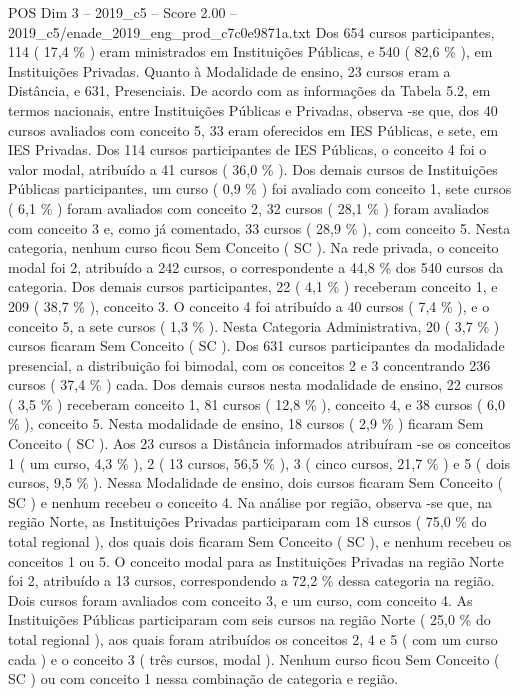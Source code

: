 \begin{textsample}{POS Dim 3 – 2019\_c5 – Score 2.00 – 2019\_c5/enade\_2019\_eng\_prod\_c7c0e9871a.txt}
Dos 654 cursos participantes, 114 ( 17,4 \% ) eram ministrados em Instituições Públicas, e 540 ( 82,6 \% ), em Instituições Privadas.
Quanto à Modalidade de ensino, 23 cursos eram a Distância, e 631, Presenciais.
De acordo com as informações da Tabela 5.2, em termos nacionais, entre Instituições Públicas e Privadas, observa -se que, dos 40 cursos avaliados com conceito 5, 33 eram oferecidos em IES Públicas, e sete, em IES Privadas.
Dos 114 cursos participantes de IES Públicas, o conceito 4 foi o valor modal, atribuído a 41 cursos ( 36,0 \% ).
Dos demais cursos de Instituições Públicas participantes, um curso ( 0,9 \% ) foi avaliado com conceito 1, sete cursos ( 6,1 \% ) foram avaliados com conceito 2, 32 cursos ( 28,1 \% ) foram avaliados com conceito 3 e, como já comentado, 33 cursos ( 28,9 \% ), com conceito 5.
Nesta categoria, nenhum curso ficou Sem Conceito ( SC ).
Na rede privada, o conceito modal foi 2, atribuído a 242 cursos, o correspondente a 44,8 \% dos 540 cursos da categoria.
Dos demais cursos participantes, 22 ( 4,1 \% ) receberam conceito 1, e 209 ( 38,7 \% ), conceito 3.
O conceito 4 foi atribuído a 40 cursos ( 7,4 \% ), e o conceito 5, a sete cursos ( 1,3 \% ).
Nesta Categoria Administrativa, 20 ( 3,7 \% ) cursos ficaram Sem Conceito ( SC ).
Dos 631 cursos participantes da modalidade presencial, a distribuição foi bimodal, com os conceitos 2 e 3 concentrando 236 cursos ( 37,4 \% ) cada.
Dos demais cursos nesta modalidade de ensino, 22 cursos ( 3,5 \% ) receberam conceito 1, 81 cursos ( 12,8 \% ), conceito 4, e 38 cursos ( 6,0 \% ), conceito 5.
Nesta modalidade de ensino, 18 cursos ( 2,9 \% ) ficaram Sem Conceito ( SC ).
Aos 23 cursos a Distância informados atribuíram -se os conceitos 1 ( um curso, 4,3 \% ), 2 ( 13 cursos, 56,5 \% ), 3 ( cinco cursos, 21,7 \% ) e 5 ( dois cursos, 9,5 \% ).
Nessa Modalidade de ensino, dois cursos ficaram Sem Conceito ( SC ) e nenhum recebeu o conceito 4.
Na análise por região, observa -se que, na região Norte, as Instituições Privadas participaram com 18 cursos ( 75,0 \% do total regional ), dos quais dois ficaram Sem Conceito ( SC ), e nenhum recebeu os conceitos 1 ou 5.
O conceito modal para as Instituições Privadas na região Norte foi 2, atribuído a 13 cursos, correspondendo a 72,2 \% dessa categoria na região.
Dois cursos foram avaliados com conceito 3, e um curso, com conceito 4.
As Instituições Públicas participaram com seis cursos na região Norte ( 25,0 \% do total regional ), aos quais foram atribuídos os conceitos 2, 4 e 5 ( com um curso cada ) e o conceito 3 ( três cursos, modal ).
Nenhum curso ficou Sem Conceito ( SC ) ou com conceito 1 nessa combinação de categoria e região.

\end{textsample}
